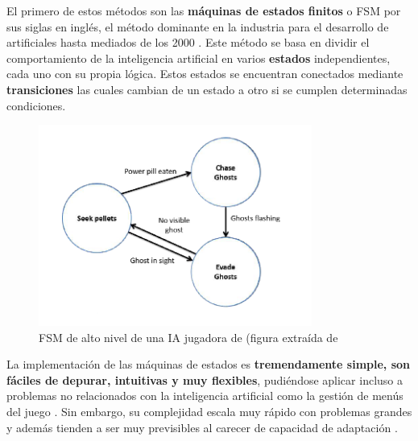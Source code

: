 El primero de estos métodos son las \textbf{máquinas de estados finitos} o FSM por sus siglas en inglés, el método dominante en la industria para el desarrollo de  artificiales hasta mediados de los 2000 \cite{ai_and_games}. Este método se basa en dividir el comportamiento de la inteligencia artificial en varios \textbf{estados} independientes, cada uno con su propia lógica. Estos estados se encuentran conectados mediante \textbf{transiciones} las cuales cambian de un estado a otro si se cumplen determinadas condiciones.

\begin{figure}[h]
	\includegraphics[width=0.8\textwidth]{images/estadodelarte/ai/pacman-fsm}
	\centering
	\caption{FSM de alto nivel de una IA jugadora de  (figura extraída de \cite{ai_and_games}}
	\label{pacman}
\end{figure}

La implementación de las máquinas de estados es \textbf{tremendamente simple, son fáciles de depurar, intuitivas y muy flexibles}, pudiéndose aplicar incluso a problemas no relacionados con la inteligencia artificial como la gestión de menús del juego \cite{libro_esi}. Sin embargo, su complejidad escala muy rápido con problemas grandes y además tienden a ser muy previsibles al carecer de capacidad de adaptación \cite{ai_and_games}.

